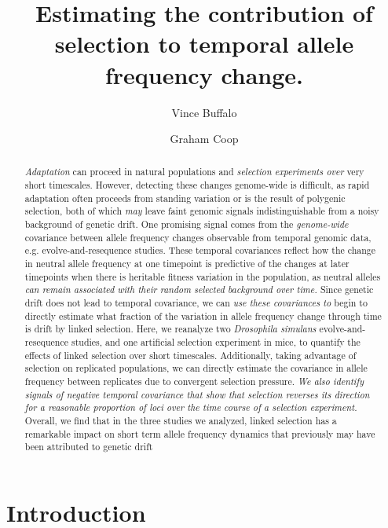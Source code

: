 \documentclass[11pt]{article}
\title{Estimating the contribution of selection to temporal allele frequency change. }
\author[$\ast$,$\dag$,$1$]{Vince Buffalo}
\author[$\dag$]{Graham Coop}
\affil[$\ast$]{\footnotesize Population Biology Graduate Group}
\affil[$\dag$]{\footnotesize Center for Population Biology, Department of Evolution and Ecology, University of California, Davis, CA 95616}
\affil[$1$]{\footnotesize Email for correspondence: \href{mailto:vsbuffalo@ucdavis.edu}{vsbuffalo@ucdavis.edu}}
\newcommand{\gc}[1]{{\it \color{red} #1 } }
\begin{document}
\maketitle

\linenumbers

\begin{abstract}
  \gc{Adaptation} can proceed in natural populations and \gc{selection
  experiments over} very short timescales.
  However, detecting these changes genome-wide is difficult, as rapid
  adaptation often proceeds from standing variation or is the result of
  polygenic selection, both of which \gc{may} leave faint genomic signals
  indistinguishable from a noisy background of genetic drift. One promising signal comes from
  the \gc{genome-wide} covariance between allele frequency changes observable from temporal
  genomic data, e.g. evolve-and-resequence studies. These temporal covariances
  reflect how the change in neutral allele frequency at one timepoint is
  predictive of the changes at later timepoints when there is heritable fitness
  variation in the population, as neutral alleles \gc{can remain
  associated with their random selected background over time.}
  Since genetic drift does not lead to temporal covariance,
  we can \gc{use these covariances to} begin to directly estimate what fraction of the variation in allele
  frequency change through time is drift by linked selection. Here, we
  reanalyze two \emph{Drosophila simulans} evolve-and-resequence studies, and
  one artificial selection experiment in mice, to quantify the effects of
  linked selection over short timescales. Additionally, taking advantage of
  selection on replicated populations, we can directly estimate the covariance
  in allele frequency between replicates due to convergent selection
  pressure.
  \gc{We also identify signals of negative temporal covariance that
   show that selection reverses its direction for a reasonable
   proportion of loci over the time course of a selection experiment.}
  Overall, we find that in the three studies we analyzed, linked selection has
  a remarkable impact on short term allele frequency dynamics that previously
  may have been attributed to genetic drift
\end{abstract}



\section{Introduction}
\end{document}
